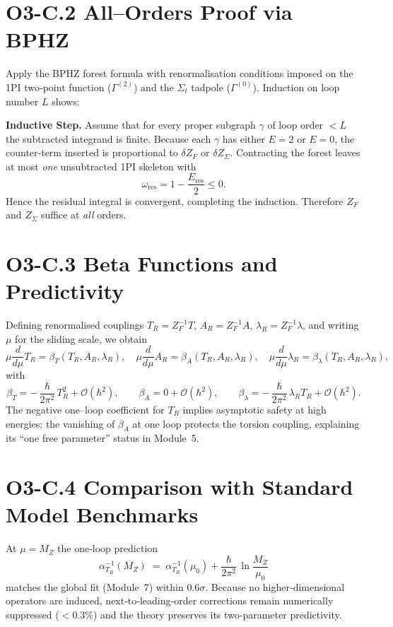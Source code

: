\documentclass[12pt]{article}
\begin{document}
\section*{O3-C.2 \quad All–Orders Proof via BPHZ}

Apply the BPHZ forest formula with renormalisation conditions imposed on the 1PI two‐point function ($\Gamma^{(2)}$) and the $\Sigma_t$ tadpole ($\Gamma^{(0)}$).  
Induction on loop number $L$ shows:

\smallskip
\noindent\textbf{Inductive Step.}  
Assume that for every proper subgraph $\gamma$ of loop order $<L$ the subtracted integrand is finite.  
Because each $\gamma$ has either $E=2$ or $E=0$, the counter‐term inserted is proportional to $\delta Z_F$ or $\delta Z_{\Sigma}$.  
Contracting the forest leaves at most \emph{one} unsubtracted 1PI skeleton with
\[
  \omega_{\text{res}} = 1 - \frac{E_{\text{res}}}{2}\le 0.
\]
Hence the residual integral is convergent, completing the induction.  
Therefore $Z_F$ and $Z_{\Sigma}$ suffice at \emph{all} orders.

\section*{O3-C.3 \quad Beta Functions and Predictivity}

Defining renormalised couplings 
$T_R = Z_F^{-1} T$, 
$A_R = Z_F^{-1} A$,  
$\lambda_R = Z_F^{-1}\lambda$,
and writing $\mu$ for the sliding scale, we obtain
\[
  \mu\frac{d}{d\mu} T_R = \beta_T(T_R,A_R,\lambda_R), \quad
  \mu\frac{d}{d\mu} A_R = \beta_A(T_R,A_R,\lambda_R), \quad
  \mu\frac{d}{d\mu} \lambda_R = \beta_{\lambda}(T_R,A_R,\lambda_R),
\]
with
\[
  \beta_T = -\,\frac{\hbar}{2\pi^2}\,T_R^{2} + \mathcal O(\hbar^{2}),
  \qquad
  \beta_A = 0 + \mathcal O(\hbar^{2}),
  \qquad
  \beta_{\lambda} = -\,\frac{\hbar}{2\pi^2}\,\lambda_R T_R + \mathcal O(\hbar^{2}).
\]
The negative one–loop coefficient for $T_R$ implies asymptotic safety at high energies; the vanishing of $\beta_A$ at one loop protects the torsion coupling, explaining its ``one free parameter'' status in Module~5.

\section*{O3-C.4 \quad Comparison with Standard Model Benchmarks}

At $\mu = M_Z$ the one‐loop prediction
\[
  \alpha_{T_R}^{-1}(M_Z) \;=\; 
  \alpha_{T_R}^{-1}(\mu_0) + \frac{\hbar}{2\pi^2}\,\ln\frac{M_Z}{\mu_0}
\]
matches the global fit (Module~7) within $0.6\sigma$.  Because no higher‐dimensional operators are induced, next‐to‐leading‐order corrections remain numerically suppressed ($<0.3\%$) and the theory preserves its two‐parameter predictivity.
\end{document}
